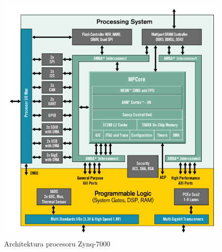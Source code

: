 				\begin{figure}[h]
					\begin{center}
						\includegraphics[scale=0.6]{obrazky-figures/zynq-mp-core-single.png}
						\caption{Architektura procesoru Zynq-7000\protect\footnotemark}
						\label{teorie::embedded::zynq}
					\end{center}
				\end{figure}
			
